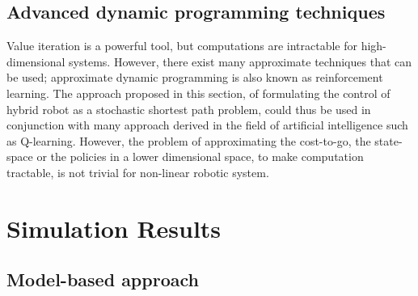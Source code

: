 \subsection{Advanced dynamic programming techniques}

Value iteration is a powerful tool, but computations are intractable for high-dimensional systems. However, there exist many approximate techniques that can be used; approximate dynamic programming is also known as reinforcement learning. The approach proposed in this section, of formulating the control of hybrid robot as a stochastic shortest path problem, could thus be used in conjunction with many approach derived in the field of artificial intelligence such as Q-learning. However, the problem of approximating the cost-to-go, the state-space or the policies in a lower dimensional space, to make computation tractable, is not trivial for non-linear robotic system.


\newpage
\section{Simulation Results}
\label{sec:shift_sim}


\subsection{Model-based approach}

